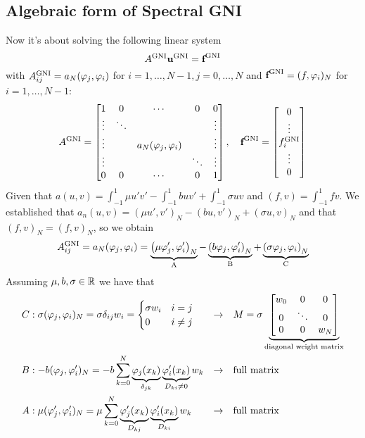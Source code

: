 \subsection*{Algebraic form of Spectral GNI}
Now it's about solving the following linear system 
\[
    A^{\text{GNI}}\textbf{u}^{\text{GNI}} = \textbf{f}^{\text{GNI}}
\]
with \(A_{ij}^{\text{GNI}} = a_N(\varphi_j, \varphi_i)\) for \(i = 1,\ldots, N-1, j = 0, \ldots, N\) and \(\textbf{f}^{\text{GNI}} = (f,\varphi_i)_N\) for \(i = 1, \ldots, N-1\):
\[
    A^{\txt{GNI}} = \left[\begin{matrix*}
        1 & 0 & \cdots & 0 & 0 \\
        \vdots & \ddots & & &\vdots\\
        \vdots & & a_N(\phi_j, \phi_i) & & \vdots \\
        \vdots & & & \ddots & \vdots \\
        0 & 0 & \cdots & 0 & 1
    \end{matrix*}\right], \quad \vect{f}^{\txt{GNI}} = \left[\begin{matrix*}
        0 \\ \vdots \\ f_i^{\txt{GNI}} \\ \vdots \\ 0
    \end{matrix*}\right]
\]
Given that \(a(u,v) = \int_{-1}^1 \mu u' v' - \int_{-1}^1 bu v' + \int_{-1}^1 \sigma u v\) and \((f,v) = \int_{-1}^1 fv\). We established that \(a_n(u,v) = (\mu u', v')_N - (bu,v')_N + (\sigma u, v)_N\) and that \((f,v)_N = (f,v)_N\), so we obtain 
\[
    A_{ij}^{\text{GNI}} = a_N(\varphi_j, \varphi_i) = \underbrace{\left(\mu \varphi_j', \varphi_i'\right)_N}_{\text{A}} - \underbrace{\left(b\varphi_j, \varphi_i'\right)_N}_{\text{B}}+\underbrace{\left(\sigma \varphi_j, \varphi_i\right)_N}_{\text{C}}
\]
Assuming \(\mu, b, \sigma \in \mathbb{R}\) we have that 
\begin{align*}
    C&: \sigma(\varphi_j, \varphi_i)_N = \sigma \delta_{ij} w_i = \begin{cases}
        \sigma w_i & i = j \\
        0 & i\neq j
    \end{cases} &\rightarrow &\quad M = \sigma \underbrace{\left[\begin{matrix}
        w_0 & 0 & 0 \\ 
        0 & \ddots & 0 \\
        0 & 0 & w_N
    \end{matrix}\right]}_{\text{diagonal weight matrix}} \\
    B&: - b(\varphi_j, \varphi_i')_N = -b\sum_{k=0}^{N} \underbrace{\varphi_j(x_k)}_{\delta_{jk}}\underbrace{\varphi_i'(x_k)}_{D_{ki}\neq 0} w_k &\rightarrow& \quad \text{full matrix} \\ 
    A&: \mu(\varphi_j', \varphi_i')_N = \mu\sum_{k=0}^{N} \underbrace{\varphi_j'(x_k)}_{D_{kj}}\underbrace{\varphi_i'(x_k)}_{D_{ki}} w_k &\rightarrow& \quad \text{full matrix}
\end{align*}
